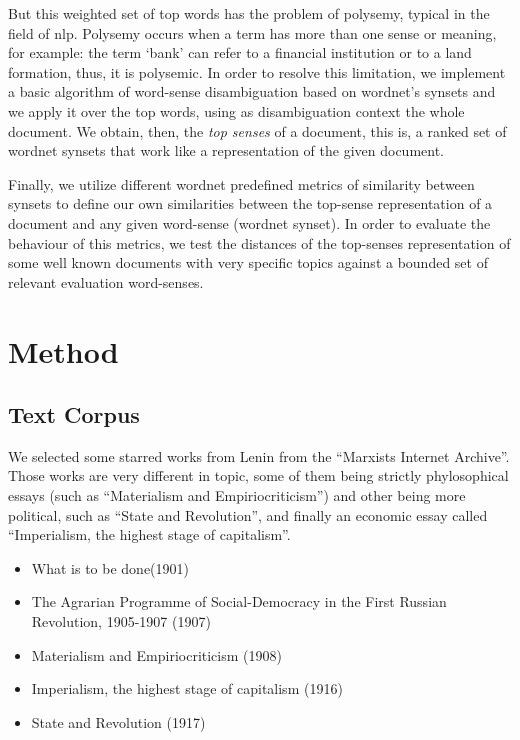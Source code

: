 \documentclass{pnastwo}
\begin{document}
\begin{article}
But this weighted set of top words has the problem of polysemy, typical in the field of nlp. Polysemy occurs when a term has more than one sense or meaning, for example: the term `bank' can refer to a financial institution or to a land formation, thus, it is polysemic. In order to resolve this limitation, we implement a basic algorithm of word-sense disambiguation based on wordnet's synsets and we apply it over the top words, using as disambiguation context the whole document. We obtain, then, the \textit{top senses} of a document, this is, a ranked set of wordnet synsets that work like a representation of the given document.

Finally, we utilize different wordnet predefined metrics of similarity between synsets to define our own similarities between the top-sense representation of a document and any given word-sense (wordnet synset). In order to evaluate the behaviour of this metrics, we test the distances of the top-senses representation of some well known documents with very specific topics against a bounded set of relevant evaluation word-senses. 


\section{Method}
\subsection{Text Corpus}

We selected some starred works from Lenin from the ``Marxists Internet Archive''\cite{LENIN}. Those works are very different in topic, some of them being strictly phylosophical essays (such as ``Materialism and Empiriocriticism'') and other being more political, such as ``State and Revolution'', and finally an economic essay called ``Imperialism, the highest stage of capitalism''. 

\begin{itemize}
  \item What is to be done(1901)
  \item The Agrarian Programme of Social-Democracy in the First Russian Revolution, 1905-1907 (1907)
  \item Materialism and Empiriocriticism (1908)
  \item Imperialism, the highest stage of capitalism (1916)
  \item State and Revolution (1917)
\end{itemize}



\end{article}
\end{document}
